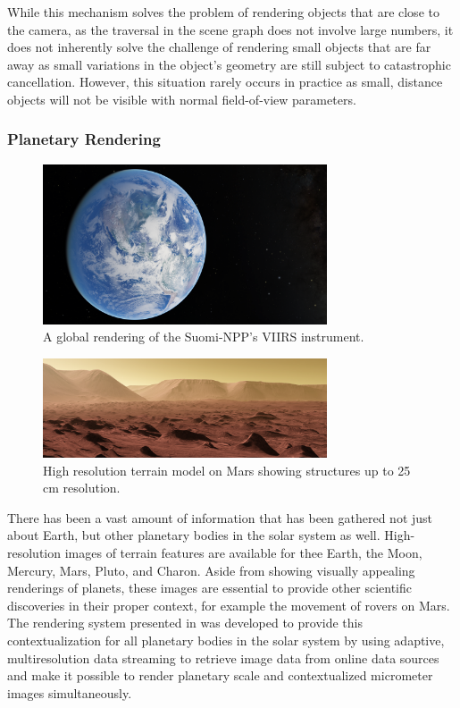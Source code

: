 While this mechanism solves the problem of rendering objects that are close to the camera, as the traversal in the scene graph does not involve large numbers, it does not inherently solve the challenge of rendering small objects that are far away as small variations in the object's geometry are still subject to catastrophic cancellation.  However, this situation rarely occurs in practice as small, distance objects will not be visible with normal field-of-view parameters.



\subsubsection{Planetary Rendering} \label{contributions:astro:gb}
\begin{figure}
\centering
\includegraphics[width=0.75\textwidth]{figures/contributions/gb/earth.png}
\caption{A global rendering of the Suomi-NPP's VIIRS instrument.}
\label{contributions:astro:gb:earth}
\end{figure}

\begin{figure}
\centering
\includegraphics[width=0.75\textwidth]{figures/contributions/gb/mars.png}
\caption{High resolution terrain model on Mars showing structures up to 25\,cm resolution.}
\label{contributions:astro:gb:mars}
\end{figure}

There has been a vast amount of information that has been gathered not just about Earth, but other planetary bodies in the solar system as well.  High-resolution images of terrain features are available for thee Earth, the Moon, Mercury, Mars, Pluto, and Charon.  Aside from showing visually appealing renderings of planets, these images are essential to provide other scientific discoveries in their proper context, for example the movement of rovers on Mars.  The rendering system presented in  was developed to provide this contextualization for all planetary bodies in the solar system by using adaptive, multiresolution data streaming to retrieve image data from online data sources and make it possible to render planetary scale and contextualized micrometer images simultaneously.


